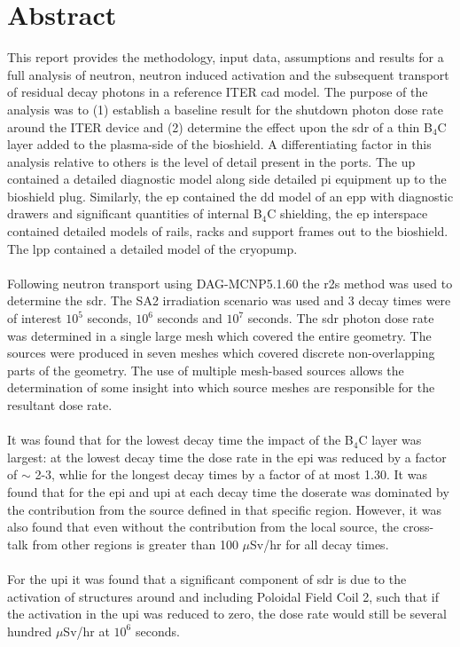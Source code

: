 \documentclass[12pt]{article}
\begin{document}
\section*{Abstract}
This report provides the methodology, input data, assumptions and results for a
full analysis of neutron, neutron induced activation and the subsequent
transport of residual decay photons in a reference ITER \gls{cad} model. The 
purpose of the analysis was to (1) establish a baseline result for the shutdown 
photon dose rate around the ITER device and (2) determine the effect upon the 
\gls{sdr} of a thin B$_4$C layer added to the plasma-side of the bioshield. A 
differentiating factor in this analysis relative to others is the level of 
detail present in the ports. The \gls{up} contained a detailed diagnostic model 
along side detailed \gls{pi} equipment up to the bioshield plug. Similarly, the 
\gls{ep} contained the \gls{dd} model of an \gls{epp} with diagnostic drawers 
and significant quantities of internal B$_4$C shielding, the \gls{ep} interspace
contained detailed models of rails, racks and support frames out to the 
bioshield. The \gls{lpp} contained a detailed model of the cryopump. 
\\
\\
Following neutron transport using DAG-MCNP5.1.60 the \gls{r2s} method was used 
to  determine the \gls{sdr}. The SA2 irradiation scenario was used and 3 decay
times were of interest $10^5$ seconds, $10^6$ seconds and 
$10^7$ seconds. The \gls{sdr} photon dose rate was determined in a 
single large mesh which covered the entire geometry. The sources were produced 
in seven meshes which covered discrete non-overlapping parts of the geometry. 
The use of multiple mesh-based sources allows the determination of some insight into which 
source meshes are responsible for the resultant dose rate.
\\
\\
It was found that for the lowest decay time the impact of the B$_4$C layer was 
largest: at the lowest decay time the dose rate in the \gls{epi} was reduced
by a factor of $\sim$ 2-3, whlie for the longest decay times by a factor of at most 
1.30. It was found that for the \gls{epi} and \gls{upi} at each decay time 
the doserate was dominated by the contribution from the source defined in that
specific region. However, it was also found that even without the contribution from
the local source, the cross-talk from other regions is greater than 100 
$\mu$Sv/hr for all decay times.
\\
\\
For the \gls{upi} it was found that a significant component of \gls{sdr} is due
to the activation of structures around and including  Poloidal Field Coil 2, such 
that if the activation in the \gls{upi} was reduced to zero, the dose rate would
still be several hundred $\mu$Sv/hr at $10^6$ seconds.
\end{document}
